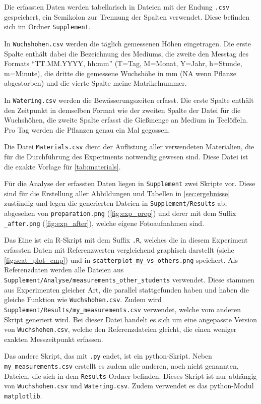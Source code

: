     \newpage
    Die erfassten Daten werden tabellarisch in Dateien mit der Endung \texttt{.csv} gespeichert, ein Semikolon zur Trennung der Spalten verwendet. Diese befinden sich im Ordner \texttt{Supplement}.

    In \texttt{Wuchshohen.csv} werden die täglich gemessenen Höhen eingetragen. Die erste Spalte enthält dabei die Bezeichnung des Mediums, die zweite den Messtag des Formats ``TT.MM.YYYY, hh:mm'' (T=Tag, M=Monat, Y=Jahr, h=Stunde, m=Minute), die dritte die gemessene Wuchshöhe in mm (NA wenn Pflanze abgestorben) und die vierte Spalte meine Matrikelnummer.

    In \texttt{Watering.csv} werden die Bewässerungszeiten erfasst. Die erste Spalte enthält den Zeitpunkt in demselben Format wie der zweiten Spalte der Datei für die Wuchshöhen, die zweite Spalte erfasst die Gießmenge an Medium in Teelöffeln. Pro Tag werden die Pflanzen genau ein Mal gegossen.

    Die Datei \texttt{Materials.csv} dient der Auflistung aller verwendeten Materialien, die für die Durchführung des Experiments notwendig gewesen sind. Diese Datei ist die exakte Vorlage für \autoref{tab:materials}.

    Für die Analyse der erfassten Daten liegen in \texttt{Supplement} zwei Skripte vor. Diese sind für die Erstellung aller Abbildungen und Tabellen in \autoref{sec:ergebnisse} zuständig und legen die generierten Dateien in \texttt{Supplement/Results} ab, abgesehen von \texttt{preparation.png} (\autoref{fig:exp_prep}) und derer mit dem Suffix \texttt{\_after.png} (\autoref{fig:exp_after}), welche eigene Fotoaufnahmen sind.

    Das Eine ist ein R-Skript mit dem Suffix \texttt{.R}, welches die in diesem Experiment erfassten Daten mit Referenzwerten vergleichend graphisch darstellt (siehe \autoref{fig:scat_plot_cmp}) und in \texttt{scatterplot\_my\_vs\_others.png} speichert. Als Referenzdaten werden alle Dateien aus \texttt{Supplement/Analyse/measurements\_other\_students} verwendet. Diese stammen aus Experimenten gleicher Art, die parallel stattgefunden haben und haben die gleiche Funktion wie \texttt{Wuchshohen.csv}. Zudem wird \texttt{Supplement/Results/my\_measurements.csv} verwendet, welche vom anderen Skript generiert wird. Bei dieser Datei handelt es sich um eine angepasste Version von \texttt{Wuchshohen.csv}, welche den Referenzdateien gleicht, die einen weniger exakten Messzeitpunkt erfassen.

    Das andere Skript, das mit \texttt{.py} endet, ist ein python-Skript. Neben \texttt{my\_measurements.csv} erstellt es zudem alle anderen, noch nicht genannten, Dateien, die sich in dem \texttt{Results}-Ordner befinden. Dieses Skript ist nur abhängig von \texttt{Wuchshohen.csv} und \texttt{Watering.csv}. Zudem verwendet es das python-Modul \texttt{matplotlib}.

